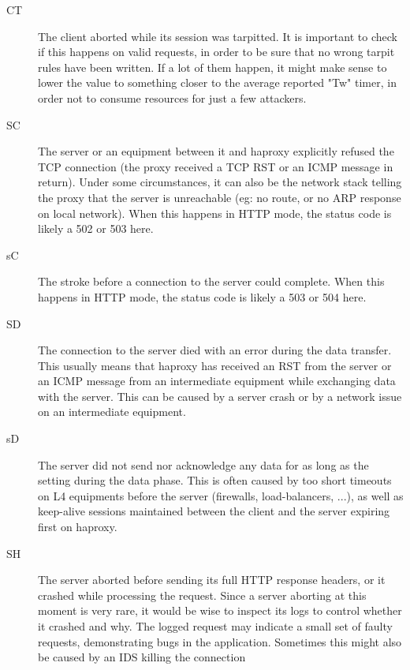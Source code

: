 \begin{description}
     \item[CT]
          The client aborted while its session was tarpitted. It is important to
          check if this happens on valid requests, in order to be sure that no
          wrong tarpit rules have been written. If a lot of them happen, it
          might make sense to lower the  value to something
          closer to the average reported "Tw" timer, in order not to consume
          resources for just a few attackers.
     \item[SC]
          The server or an equipment between it and haproxy explicitly refused
          the TCP connection (the proxy received a TCP RST or an ICMP message
          in return). Under some circumstances, it can also be the network
          stack telling the proxy that the server is unreachable (eg: no route,
          or no ARP response on local network). When this happens in HTTP mode,
          the status code is likely a 502 or 503 here.
     \item[sC]
          The  stroke before a connection to the server could
          complete. When this happens in HTTP mode, the status code is likely a
          503 or 504 here.
     \item[SD]
          The connection to the server died with an error during the data
          transfer. This usually means that haproxy has received an RST from
          the server or an ICMP message from an intermediate equipment while
          exchanging data with the server. This can be caused by a server crash
          or by a network issue on an intermediate equipment.
     \item[sD]
          The server did not send nor acknowledge any data for as long as the
           setting during the data phase. This is often caused
          by too short timeouts on L4 equipments before the server (firewalls,
          load-balancers, ...), as well as keep-alive sessions maintained
          between the client and the server expiring first on haproxy.
     \item[SH]
          The server aborted before sending its full HTTP response headers, or
          it crashed while processing the request. Since a server aborting at
          this moment is very rare, it would be wise to inspect its logs to
          control whether it crashed and why. The logged request may indicate a
          small set of faulty requests, demonstrating bugs in the application.
          Sometimes this might also be caused by an IDS killing the connection

\end{description}
